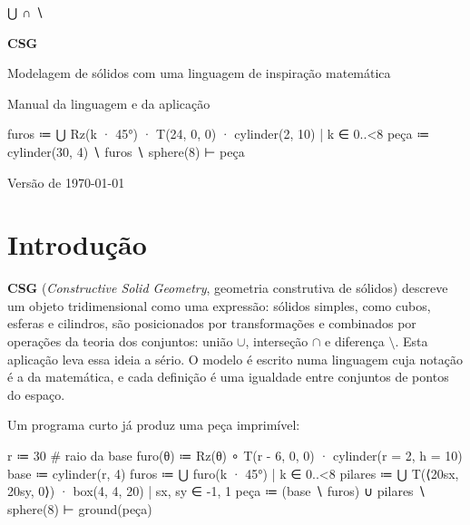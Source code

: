 \begin{titlepage}
\vspace*{38mm}
{\fontsize{64}{64}\selectfont\ttfamily\color{accent} ⋃ ∩ ∖\par}
\vspace{16pt}
{\sffamily\bfseries\fontsize{34}{38}\selectfont CSG\par}
\vspace{8pt}
{\sffamily\Large\color{muted} Modelagem de sólidos com uma linguagem de inspiração matemática\par}
\vspace{2pt}
{\sffamily\large\color{muted} Manual da linguagem e da aplicação\par}
\vspace{28pt}
\begin{minipage}{130mm}
\begin{csg}[run]
furos ≔ ⋃{ Rz(k · 45°) · T(24, 0, 0) · cylinder(2, 10) | k ∈ 0..<8 }
peça  ≔ cylinder(30, 4) ∖ furos ∖ sphere(8)
⊢ peça
\end{csg}
\end{minipage}
\vfill
{\sffamily\small\color{muted} Versão de \today\par}
\end{titlepage}

{\hypersetup{linkcolor=black}\tableofcontents}

\section{Introdução}\label{sec:intro}

\textbf{CSG} (\emph{Constructive Solid Geometry}, geometria construtiva de sólidos) descreve um objeto tridimensional como
uma expressão: sólidos simples, como cubos, esferas e cilindros, são posicionados por transformações e combinados por
operações da teoria dos conjuntos: união $\cup$, interseção $\cap$ e diferença $\setminus$.
Esta aplicação leva essa ideia a sério. O modelo é escrito numa linguagem cuja notação é a da matemática, e cada
definição é uma igualdade entre conjuntos de pontos do espaço.

Um programa curto já produz uma peça imprimível:

\begin{csg}[run, id=flange-mini]
r ≔ 30                                       # raio da base
furo(θ) ≔ Rz(θ) ∘ T(r - 6, 0, 0) · cylinder(r = 2, h = 10)
base    ≔ cylinder(r, 4)
furos   ≔ ⋃{ furo(k · 45°) | k ∈ 0..<8 }
pilares ≔ ⋃{ T(⟨20sx, 20sy, 0⟩) · box(4, 4, 20) | sx, sy ∈ {-1, 1} }
peça    ≔ (base ∖ furos) ∪ pilares ∖ sphere(8)
⊢ ground(peça)
\end{csg}

